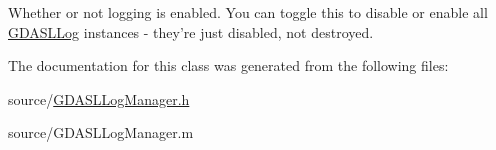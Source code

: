 Whether or not logging is enabled. You can toggle this to disable or enable all \hyperlink{interface_g_d_a_s_l_log}{GDASLLog} instances -\/ they're just disabled, not destroyed. 

The documentation for this class was generated from the following files:\begin{DoxyCompactItemize}
\item 
source/\hyperlink{_g_d_a_s_l_log_manager_8h}{GDASLLogManager.h}\item 
source/GDASLLogManager.m\end{DoxyCompactItemize}
